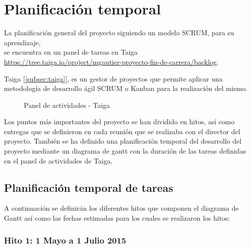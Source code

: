 \chapter{Planificación temporal}
\label{chap:planificacion}

La planificación general del proyecto siguiendo un modelo SCRUM, para su aprendizaje, \\ se encuentra en un panel de tareas en Taiga \\ \url{https://tree.taiga.io/project/mgautier-proyecto-fin-de-carrera/backlog}.

Taiga [\ref{subsec:taiga}], es un gestor de proyectos que permite aplicar una metodología de desarrollo ágil SCRUM o Kanban para la realización del mismo.

\begin{figure}[H]
\caption{Panel de actividades - Taiga}
\end{figure}

Los puntos más importantes del proyecto se han dividido en hitos, así como entregas que se definieron en cada reunión que se realizaba con el director del proyecto. También se ha definido una planificación temporal del desarrollo del proyecto mediante un diagrama de gantt con la duración de las tareas definidas en el panel de actividades de Taiga.\\
\newpage
{}
\section[Tareas]{Planificación temporal de tareas}

A continuación se definirán los diferentes hitos que componen el diagrama de Gantt así como las fechas estimadas para los cuales se realizaron los hitos:
\subsection{Hito 1: 1 Mayo a 1 Julio 2015}
\label{subsec:hito1}


